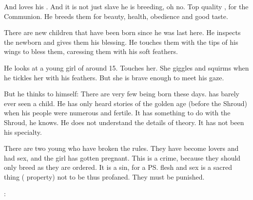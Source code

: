 
And \Teshrial{} loves his \humans. 
And it is not just slave \humans{} he is breeding, oh no. 
Top quality \humans{}, for the {Communion}. 
He breeds them for beauty, health, obedience and good taste. 

There are new children that have been born since he was last here. 
He inspects the newborn and gives them his blessing. 
He touches them with the tips of his wings to bless them, caressing them with his soft feathers. 

He looks at a young girl of around 15. 
Touches her. 
She giggles and squirms when he tickles her with his feathers. 
But she is brave enough to meet his gaze. 



But he thinks to himself: 
There are very few \resphain{} being born these days. 
\Teshrial{} has barely ever seen a \resphan{} child. 
He has only heard stories of the golden age ({before the Shroud}) when his people were numerous and fertile. 
It has something to do with the Shroud, he knows. 
He does not understand the details of \dweomer{} theory. 
It has not been his specialty. 







\begin{comment}
\subsection{Punishment}
\end{comment}
\new
There are two young \humans{} who have broken the rules. 
They have become lovers and had sex, and the girl has gotten pregnant. 
This is a crime, because they should only breed as they are ordered. 
It is a sin, for a \ps{\human} flesh and sex is a sacred thing (\resphan{} property) not to be thus profaned. 
They must be punished. 

\Teshrial: 










